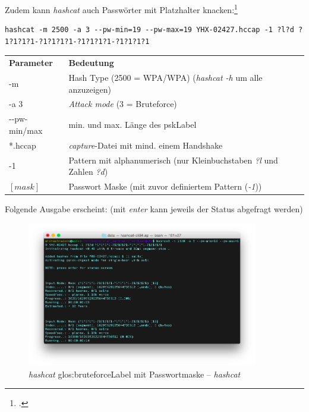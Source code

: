 Zudem kann \textit{hashcat} auch Passwörter mit Platzhalter knacken:\footcite{mask_attack_hashcat_wiki_2015-04-13}
\begin{lstlisting}[style=lstStyleFramed]
hashcat -m 2500 -a 3 --pw-min=19 --pw-max=19 YHX-02427.hccap -1 ?l?d ?1?1?1?1-?1?1?1?1-?1?1?1?1-?1?1?1?1
\end{lstlisting}
\begin{tabular}{l l}
	\textbf{Parameter} & \textbf{Bedeutung}\\
	-m & Hash Type (2500 = WPA/WPA) (\textit{hashcat -h} um alle anzuzeigen)\\
	-a 3 & \textit{Attack mode} (3 = Bruteforce)\\
	-{}-pw-min/max & min. und max. Länge des \gls{pskLabel}\\
	*.hccap & \textit{capture}-Datei mit mind. einem Handshake\\
	-1 & Pattern mit alphanumerisch (nur Kleinbuchstaben \textit{?l} und Zahlen \textit{?d})\\
	$[mask]$ & Passwort Maske (mit zuvor definiertem Pattern (\textit{-1}))\\
\end{tabular}

Folgende Ausgabe erscheint: (mit \textit{enter} kann jeweils der Status abgefragt werden)
\begin{figure}[H]
	\centering
	\includegraphics[width=0.9\textwidth]{images/wpa/hashcat_bruteforce_pattern.png}
	\caption{\textit{hashcat} \gls{glos:bruteforceLabel} mit Passwortmaske -- \textit{hashcat}}\label{fig:hashcat_bruteforce_pattern}
\end{figure}

